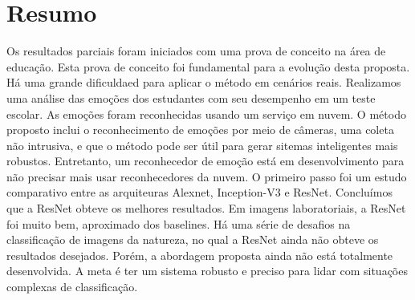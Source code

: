 \section{Resumo}\label{sec:considera}
Os resultados parciais foram iniciados com uma prova de conceito na área de educação. Esta prova de conceito foi fundamental para a evolução desta proposta. Há uma grande dificuldaed para aplicar o método em cenários reais. Realizamos uma análise das emoções dos estudantes com seu desempenho em um teste escolar. As emoções foram reconhecidas usando um serviço em nuvem. O método proposto inclui o reconhecimento de emoções por meio de câmeras, uma coleta não intrusiva, e que o método pode ser útil para gerar sitemas inteligentes mais robustos. Entretanto, um reconhecedor de emoção está em desenvolvimento para não precisar mais usar reconhecedores da nuvem. O primeiro passo foi um estudo comparativo entre as arquiteuras Alexnet, Inception-V3 e ResNet. Concluímos que a ResNet obteve os melhores resultados. Em imagens laboratoriais, a ResNet foi muito bem, aproximado dos baselines. Há uma série de desafios na classificação de imagens da natureza, no qual a ResNet ainda não obteve os resultados desejados. Porém, a abordagem proposta ainda não está totalmente desenvolvida. A meta é ter um sistema robusto e preciso para lidar com situações complexas de classificação.      

